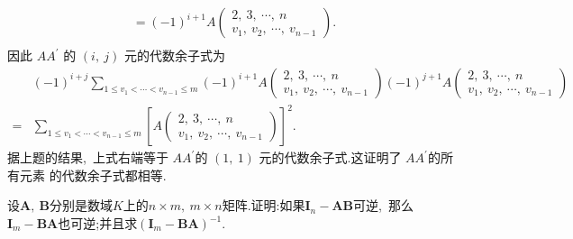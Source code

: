 \begin{solution}
	$$\begin{array}{l}
		=(-1)^{i+1} A\left(\begin{array}{l}
			2,\ 3,\  \cdots,\  n \\
			v_{1},\  v_{2},\  \cdots,\  v_{n-1}
		\end{array}\right) . \\
	\end{array}$$
	因此 $ A A^{\prime} $ 的 $ (i,\  j) $ 元的代数余子式为
	$$\begin{aligned}
		& (-1)^{i+j} \sum_{1 \leqslant v_{1}<\cdots<v_{n-1} \leqslant m}(-1)^{i+1} A\left(\begin{array}{l}
			2,\ 3,\  \cdots,\  n \\
			v_{1},\  v_{2},\  \cdots,\  v_{n-1}
		\end{array}\right)(-1)^{j+1} A\left(\begin{array}{l}
			2,\ 3,\  \cdots,\  n \\
			v_{1},\  v_{2},\  \cdots,\  v_{n-1}
		\end{array}\right) \\
		= & \sum_{1 \leqslant v_{1}<\cdots<v_{n-1} \leqslant m}\left[A\left(\begin{array}{l}
			2,\ 3,\  \cdots,\  n \\
			v_{1},\  v_{2},\  \cdots,\  v_{n-1}
		\end{array}\right)\right]^{2} .
	\end{aligned}$$
	据上题的结果,\  上式右端等于  $A A^{\prime}  $的  $(1,\ 1)$  元的代数余子式.这证明了  $A A^{\prime}  $的所有元素 的代数余子式都相等.
\end{solution}
\newpage
\begin{problem}
	设$\boldsymbol{A},\ \boldsymbol{B}$分别是数域$K$上的$n\times m,\ m\times n$矩阵.证明:如果$\boldsymbol{I}_n-\boldsymbol{AB}$可逆,\ 那么$\boldsymbol{I}_m-\boldsymbol{BA}$也可逆;并且求$(\boldsymbol{I}_m-\boldsymbol{BA})^{-1}.$
\end{problem}
